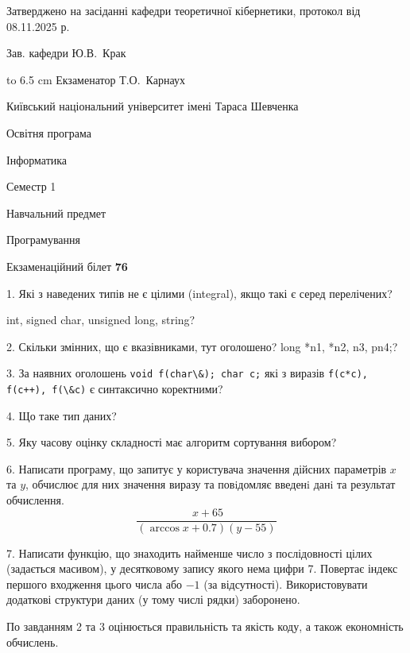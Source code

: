 \documentclass[12pt, ukrainian]{article}
\def\code#1{\Verb!#1!}
\begin{document}
{\smallskip\smallskip \begin {scriptsize} Затверджено на засіданні кафедри теоретичної кібернетики, протокол   від   08.11.2025 р.\par\smallskip\smallskip\smallskip\smallskip
{\parbox {6.5 cm} {Зав. кафедри \dotfill Ю.В.~Крак}}\hspace {0.7cm} {\hbox to 6.5 cm { Екзаменатор \dotfill Т.О.~Карнаух}} \end{scriptsize}}
\vspace{0.9cm}
{{\begin {scriptsize}\par
{ \center  Київський національний університет імені Тараса Шевченка \par}
{\parbox {5 cm}{Освітня програма \hfill}{\parbox {7 cm}{Інформатика\hfill}}\parbox {6 cm}{\hfill Семестр 1}}\par
{\parbox {5 cm} {Навчальний предмет \hfill}\parbox {7 cm}{Програмування \hfill}\parbox {6cm}{\hfill}\par}\vspace{-15pt} \end{scriptsize}}{\center Екзаменаційний білет \No \textbf { 76 }\par}}
{%
1. Які з наведених типів не є цілими (integral), якщо такі є серед перелічених?

int, signed char, unsigned long, string?
\par
\vspace{2mm}
2. Скільки змінних, що є вказівниками, тут оголошено?
long *n1, *n2, n3, pn4;?
\par
\vspace{2mm}
3. За наявних оголошень \code{void f(char\&); char c;} які з виразів \code{f(c*c), f(c++), f(\&c)} є синтаксично коректними?
\par
\vspace{2mm}
4. Що таке тип даних?
\par
\vspace{2mm}
5. Яку часову оцінку складності має алгоритм сортування вибором?
\par
\vspace{2mm}
6. Написати програму, що запитує у користувача значення дійсних параметрів $x$ та $y$, обчислює для них значення виразу та повiдомляє введенi данi та результат обчислення.
$$\frac{\ x + 65}{(\arccos x + 0.7) (y - 55)}$$ 

\par
7. Написати функцію, що знаходить найменше число з послідовності цілих (задається масивом), у десятковому запису якого нема цифри 7. Повертає індекс першого входження цього числа або $-1$ (за відсутності). Використовувати додаткові структури даних (у тому числі рядки) заборонено.

По завданням 2 та 3 оцінюється правильність та якість коду, а також економність обчислень.

}
\end{document}
